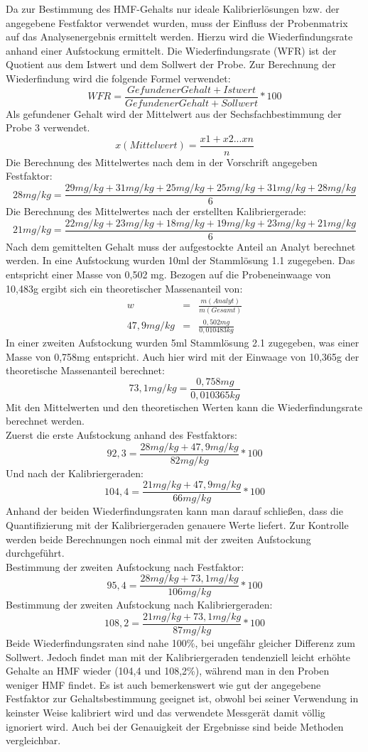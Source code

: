 Da zur Bestimmung des HMF-Gehalts nur ideale Kalibrierlösungen bzw. der angegebene Festfaktor verwendet wurden, muss der Einfluss der Probenmatrix auf das Analysenergebnis ermittelt werden. Hierzu wird die Wiederfindungsrate anhand einer Aufstockung ermittelt. Die Wiederfindungsrate (WFR) ist der Quotient aus dem Istwert und dem Sollwert der Probe. Zur Berechnung der Wiederfindung wird die folgende Formel verwendet:
    \[WFR=\frac{ Gefundener Gehalt + Istwert }{ Gefundener Gehalt + Sollwert } *100 \]
Als gefundener Gehalt wird der Mittelwert aus der Sechsfachbestimmung der Probe 3 verwendet.
    \[x(Mittelwert)=\frac{ x1+x2...xn }{ n } \]
Die Berechnung des Mittelwertes nach dem in der Vorschrift angegeben Festfaktor:
    \[28mg/kg=\frac{ 29mg/kg+31mg/kg+25mg/kg+25mg/kg+31mg/kg+28mg/kg }{ 6 } \]
Die Berechnung des Mittelwertes nach der erstellten Kalibriergerade:
    \[21mg/kg=\frac{ 22mg/kg+23mg/kg+18mg/kg+19mg/kg+23mg/kg+21mg/kg }{ 6 } \]
    Nach dem gemittelten Gehalt muss der aufgestockte Anteil an Analyt berechnet werden. In eine Aufstockung wurden 10ml der Stammlösung 1.1 zugegeben. Das entspricht einer Masse von 0,502 mg. Bezogen auf die Probeneinwaage von 10,483g ergibt sich ein theoretischer Massenanteil von:
    \begin{eqnarray*}
    w&=&\frac{ m(Analyt) }{ m(Gesamt) }\\
    47,9mg/kg&=&\frac{ 0,502mg }{ 0,010483kg }
    \end{eqnarray*}
In einer zweiten Aufstockung wurden 5ml Stammlösung 2.1 zugegeben, was einer Masse von 0,758mg entspricht. Auch hier wird mit der Einwaage von 10,365g der theoretische Massenanteil berechnet:
    \[73,1mg/kg=\frac{ 0,758mg }{ 0,010365kg } \]
Mit den Mittelwerten und den theoretischen Werten kann die Wiederfindungsrate berechnet werden.\\
Zuerst die erste Aufstockung anhand des Festfaktors:
    \[92,3=\frac{ 28mg/kg + 47,9mg/kg }{ 82mg/kg } *100 \]
Und nach der Kalibriergeraden:
    \[104,4=\frac{ 21mg/kg + 47,9mg/kg }{ 66mg/kg } *100 \]
Anhand der beiden Wiederfindungsraten kann man darauf schließen, dass die Quantifizierung mit der Kalibriergeraden genauere Werte liefert. Zur Kontrolle werden beide Berechnungen noch einmal mit der zweiten Aufstockung durchgeführt.\\
Bestimmung der zweiten Aufstockung nach Festfaktor:
    \[95,4=\frac{ 28mg/kg + 73,1mg/kg }{ 106mg/kg } *100 \]
Bestimmung der zweiten Aufstockung nach Kalibriergeraden:
    \[108,2=\frac{ 21mg/kg + 73,1mg/kg }{ 87mg/kg } *100 \]
Beide Wiederfindungsraten sind nahe 100\%, bei ungefähr gleicher Differenz zum Sollwert. Jedoch findet man mit der Kalibriergeraden tendenziell leicht erhöhte Gehalte an HMF wieder (104,4 und 108,2\%), während man in den Proben weniger HMF findet. Es ist auch bemerkenswert wie gut der angegebene Festfaktor zur Gehaltsbestimmung geeignet ist, obwohl bei seiner Verwendung in keinster Weise kalibriert wird und das verwendete Messgerät damit völlig ignoriert wird. Auch bei der Genauigkeit der Ergebnisse sind beide Methoden vergleichbar.
